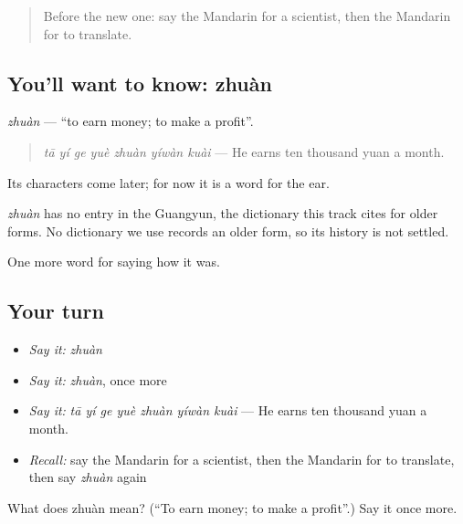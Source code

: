 \label{lesson:ZH-C488-zhuan}



\begin{quote}
Before the new one: say the Mandarin for a scientist, then the Mandarin for to translate.
\end{quote}

\subsection*{You'll want to know: zhuàn}
\emph{zhuàn} — \textquotedblleft{}to earn money; to make a profit\textquotedblright{}.

\begin{quote}
\emph{tā yí ge yuè zhuàn yíwàn kuài} — He earns ten thousand yuan a month.
\end{quote}

Its characters come later; for now it is a word for the ear.

\begin{cousinweb}
\emph{zhuàn} has no entry in the Guangyun, the dictionary this track cites for older forms. No dictionary we use records an older form, so its history is not settled.
\end{cousinweb}

\begin{grammarlens}[title={What you've built}]
One more word for saying how it was.
\end{grammarlens}

\subsection*{Your turn}
\begin{itemize}
\raggedright
  \item \emph{Say it:} \emph{zhuàn}
  \item \emph{Say it:} \emph{zhuàn}, once more
  \item \emph{Say it:} \emph{tā yí ge yuè zhuàn yíwàn kuài} — He earns ten thousand yuan a month.
  \item \emph{Recall:} say the Mandarin for a scientist, then the Mandarin for to translate, then say \emph{zhuàn} again
\end{itemize}

\begin{tcolorbox}[breakable,colback=teal!4,colframe=teal!35!black,title={Before you move on}]
What does zhuàn mean? (\textquotedblleft{}To earn money; to make a profit\textquotedblright{}.) Say it once more.
\end{tcolorbox}
